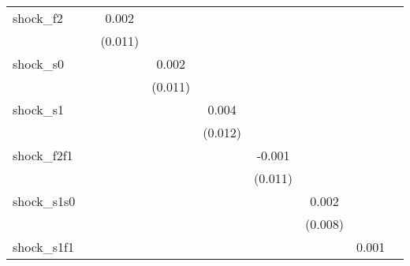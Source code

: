 {\begin{tabular}{l*{8}{c}}
\addlinespace
shock\_f2    &                     &       0.002         &                     &                     &                     &                     &                     &                     \\
            &                     &     (0.011)         &                     &                     &                     &                     &                     &                     \\
\addlinespace
shock\_s0    &                     &                     &       0.002         &                     &                     &                     &                     &                     \\
            &                     &                     &     (0.011)         &                     &                     &                     &                     &                     \\
\addlinespace
shock\_s1    &                     &                     &                     &       0.004         &                     &                     &                     &                     \\
            &                     &                     &                     &     (0.012)         &                     &                     &                     &                     \\
\addlinespace
shock\_f2f1  &                     &                     &                     &                     &      -0.001         &                     &                     &                     \\
            &                     &                     &                     &                     &     (0.011)         &                     &                     &                     \\
\addlinespace
shock\_s1s0  &                     &                     &                     &                     &                     &       0.002         &                     &                     \\
            &                     &                     &                     &                     &                     &     (0.008)         &                     &                     \\
\addlinespace
shock\_s1f1  &                     &                     &                     &                     &                     &                     &       0.001         &                     \\

\end{tabular}}
